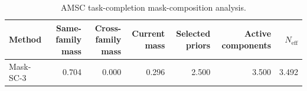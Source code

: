 \begin{table}[ht]
    \caption{AMSC task-completion mask-composition analysis.}
    \label{tbl:amsc_composition}
    \centering
    \scriptsize
    \begin{tabular}{lrrrrrr}
    \toprule
Method & Same-family mass & Cross-family mass & Current mass & Selected priors & Active components & $N_{\mathrm{eff}}$ \\
    \midrule
Mask-SC-3 & 0.704 & 0.000 & 0.296 & 2.500 & 3.500 & 3.492 \\
    \bottomrule
    \end{tabular}
\end{table}
